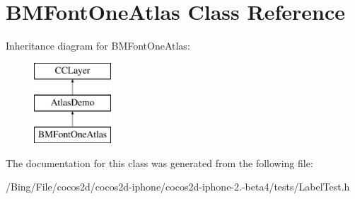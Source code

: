 \hypertarget{interface_b_m_font_one_atlas}{\section{B\-M\-Font\-One\-Atlas Class Reference}
\label{interface_b_m_font_one_atlas}
}
Inheritance diagram for B\-M\-Font\-One\-Atlas\-:\begin{figure}[H]
\begin{center}
\leavevmode
\includegraphics[height=3.000000cm]{interface_b_m_font_one_atlas}
\end{center}
\end{figure}


The documentation for this class was generated from the following file\-:\begin{DoxyCompactItemize}
\item 
/\-Bing/\-File/cocos2d/cocos2d-\/iphone/cocos2d-\/iphone-\/2.-\/beta4/tests/Label\-Test.\-h\end{DoxyCompactItemize}
